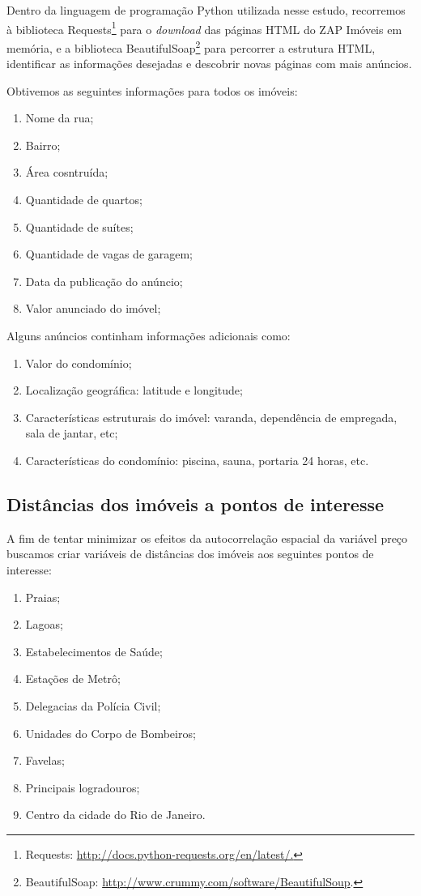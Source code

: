 Dentro da linguagem de programação Python utilizada nesse estudo, recorremos à biblioteca Requests\footnote{Requests: \url{http://docs.python-requests.org/en/latest/.}} para o \textit{download} das páginas HTML do ZAP Imóveis em memória, e a  biblioteca BeautifulSoap\footnote{BeautifulSoap: \url{http://www.crummy.com/software/BeautifulSoup}.} para percorrer a estrutura HTML, identificar as informações desejadas e descobrir novas páginas com mais anúncios.

Obtivemos as seguintes informações para todos os imóveis:

\begin{enumerate}
\item Nome da rua;
\item Bairro;
\item Área cosntruída;
\item Quantidade de quartos;
\item Quantidade de suítes;
\item Quantidade de vagas de garagem;
\item Data da publicação do anúncio;
\item Valor anunciado do imóvel;
\end{enumerate}

Alguns anúncios continham informações adicionais como:
\begin{enumerate}
\item Valor do condomínio;
\item Localização geográfica: latitude e longitude;
\item Características estruturais do imóvel: varanda, dependência de empregada, sala de jantar, etc;
\item Características do condomínio: piscina, sauna, portaria 24 horas, etc.
\end{enumerate}

\subsection{Distâncias dos imóveis a pontos de interesse}

A fim de tentar minimizar os efeitos da autocorrelação espacial da variável preço buscamos criar variáveis de distâncias dos imóveis aos seguintes pontos de interesse:

\begin{enumerate}
\item Praias;
\item Lagoas;
\item Estabelecimentos de Saúde;
\item Estações de Metrô;
\item Delegacias da Polícia Civil;
\item Unidades do Corpo de Bombeiros;
\item Favelas;
\item Principais logradouros;
\item Centro da cidade do Rio de Janeiro.
\end{enumerate}

